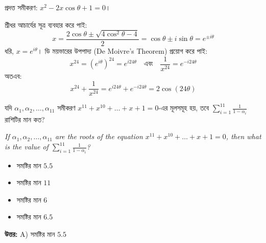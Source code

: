 \documentclass[12pt, a4paper]{article}
\begin{document}
\begin{tcolorbox}[solutionbox={সমাধান (Solution)}]
    \noindent
    প্রদত্ত সমীকরণ: $x^2 - 2x\cos\theta + 1 = 0$। 
    
    শ্রীধর আচার্যের সূত্র ব্যবহার করে পাই:
    \[ x = \frac{2\cos\theta \pm \sqrt{4\cos^2\theta - 4}}{2} = \cos\theta \pm i\sin\theta = e^{\pm i\theta} \]
    ধরি, $x = e^{i\theta}$। ডি ময়ভারের উপপাদ্য (De Moivre's Theorem) প্রয়োগ করে পাই:
    \[ x^{24} = (e^{i\theta})^{24} = e^{i 24\theta} \quad \text{এবং} \quad \frac{1}{x^{24}} = e^{-i 24\theta} \]
    অতএব:
    \[ x^{24} + \frac{1}{x^{24}} = e^{i 24\theta} + e^{-i 24\theta} = 2\cos(24\theta) \]
\end{tcolorbox}

\vspace{1em}

\begin{tcolorbox}[questionbox={প্রশ্ন (Question) 49}]
    \noindent
    যদি $\alpha_1, \alpha_2, \dots, \alpha_{11}$ সমীকরণ $x^{11} + x^{10} + \dots + x + 1 = 0$-এর মূলসমূহ হয়, তবে $\sum_{i=1}^{11} \frac{1}{1-\alpha_i}$ রাশিটির মান কত?
    
    \vspace{0.8em}
    \begin{english}
    \noindent\textit{\color{darkgray}
    If $\alpha_1, \alpha_2, \dots, \alpha_{11}$ are the roots of the equation $x^{11} + x^{10} + \dots + x + 1 = 0$, then what is the value of $\sum_{i=1}^{11} \frac{1}{1-\alpha_i}$?
    }
    \end{english}
\end{tcolorbox}

\begin{itemize}[label={}, leftmargin=1cm, itemsep=0.5em]
    \item[\textbf{A)}] সমষ্টির মান $5.5$
    \item[\textbf{B)}] সমষ্টির মান $11$
    \item[\textbf{C)}] সমষ্টির মান $6$
    \item[\textbf{D)}] সমষ্টির মান $6.5$
\end{itemize}

\vspace{0.5em}
\begin{tcolorbox}[answerbox]
    \textbf{\color{success} উত্তর:} A) সমষ্টির মান $5.5$
\end{tcolorbox}
\vspace{1em}
\end{document}

